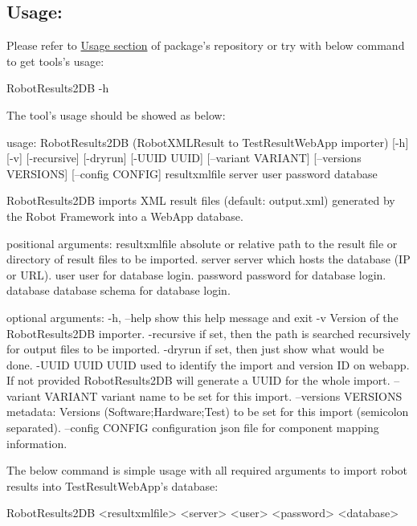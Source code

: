\subsection{Usage:}
Please refer to \href{https://github.com/test-fullautomation/robotframework-testresultwebapptool#usage}{Usage section}
of package's repository or try with below command to get tools's usage:
\begin{robotlog}
RobotResults2DB -h
\end{robotlog}

The tool's usage should be showed as below:
\begin{robotlog}
usage: RobotResults2DB (RobotXMLResult to TestResultWebApp importer) [-h] [-v] 
                     [-recursive] [-dryrun] [-UUID UUID] [--variant VARIANT] 
                     [--versions VERSIONS] [--config CONFIG]
                     resultxmlfile server user password database

RobotResults2DB imports XML result files (default: output.xml) generated by the 
                     Robot Framework into a WebApp database.

positional arguments:
resultxmlfile        absolute or relative path to the result file or directory 
                     of result files to be imported.
server               server which hosts the database (IP or URL).
user                 user for database login.
password             password for database login.
database             database schema for database login.

optional arguments:
-h, --help           show this help message and exit
-v                   Version of the RobotResults2DB importer.
-recursive           if set, then the path is searched recursively for output 
                     files to be imported.
-dryrun              if set, then just show what would be done.
-UUID UUID           UUID used to identify the import and version ID on webapp. 
                     If not provided RobotResults2DB will generate a UUID for 
                     the whole import.
--variant VARIANT    variant name to be set for this import.
--versions VERSIONS  metadata: Versions (Software;Hardware;Test) to be set for 
                     this import (semicolon separated).
--config CONFIG      configuration json file for component mapping information.
\end{robotlog}

The below command is simple usage with all required arguments to import 
robot results into TestResultWebApp's database:
\begin{robotlog}
RobotResults2DB <resultxmlfile> <server> <user> <password> <database>
\end{robotlog}


